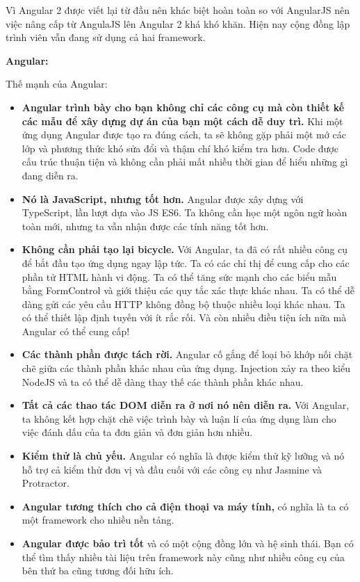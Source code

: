 Vì Angular 2 được viết lại từ đầu nên khác biệt hoàn toàn so với AngularJS nên việc nâng cấp từ AngulaJS lên Angular 2 khá khó khăn. Hiện nay cộng đồng lập trình viên vẫn đang sử dụng cả hai framework.

\textbf{Angular:}

Thế mạnh của Angular:
\begin{itemize}
    \item \textbf{Angular trình bày cho bạn không chỉ các công cụ mà còn thiết kế các mẫu để xây dựng dự án của bạn một cách dễ duy trì.} Khi một ứng dụng Angular được tạo ra đúng cách, ta sẽ không gặp phải một mớ các lớp và phương thức khó sửa đổi và thậm chí khó kiểm tra hơn. Code được cấu trúc thuận tiện và không cần phải mất nhiều thời gian để hiểu những gì đang diễn ra.
    \item \textbf{Nó là JavaScript, nhưng tốt hơn.} Angular được xây dựng với TypeScript, lần lượt dựa vào JS ES6. Ta không cần học một ngôn ngữ hoàn toàn mới, nhưng ta vẫn nhận được các tính năng tốt hơn.
    \item \textbf{Không cần phải tạo lại bicycle.} Với Angular, ta đã có rất nhiều công cụ để bắt đầu tạo ứng dụng ngay lập tức. Ta có các chỉ thị để cung cấp cho các phần tử HTML hành vi động. Ta có thể tăng sức mạnh cho các biểu mẫu bằng FormControl và giới thiệu các quy tắc xác thực khác nhau. Ta có thể dễ dàng gửi các yêu cầu HTTP không đồng bộ thuộc nhiều loại khác nhau. Ta có thể thiết lập định tuyến với ít rắc rối. Và còn nhiều điều tiện ích nữa mà Angular có thể cung cấp!
    \item \textbf{Các thành phần được tách rời.} Angular cố gắng để loại bỏ khớp nối chặt chẽ giữa các thành phần khác nhau của ứng dụng. Injection xảy ra theo kiểu NodeJS và ta có thể dễ dàng thay thế các thành phần khác nhau.
    \item \textbf{Tất cả các thao tác DOM diễn ra ở nơi nó nên diễn ra.} Với Angular, ta không kết hợp chặt chẽ việc trình bày và luận lí của ứng dụng làm cho việc đánh dấu của ta đơn giản và đơn giản hơn nhiều.
    \item \textbf{Kiểm thử là chủ yếu.} Angular có nghĩa là được kiểm thử kỹ lưỡng và nó hỗ trợ cả kiểm thử đơn vị và đầu cuối với các công cụ như Jasmine và Protractor.
    \item \textbf{Angular tương thích cho cả điện thoại va máy tính,} có nghĩa là ta có một framework cho nhiều nền tảng.
    \item \textbf{Angular được bảo trì tốt} và có một cộng đồng lớn và hệ sinh thái. Bạn có thể tìm thấy nhiều tài liệu trên framework này cũng như nhiều công cụ của bên thứ ba cũng tương đối hữu ích.
\end{itemize}

